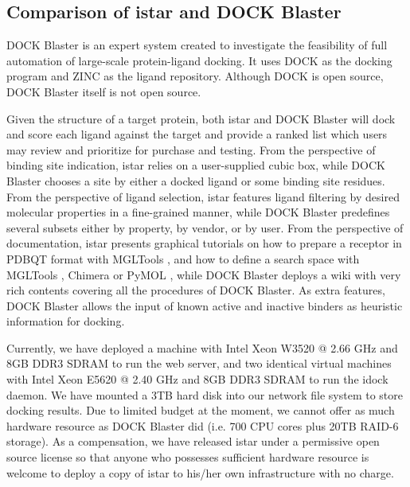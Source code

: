 \documentclass[10pt]{article}
\begin{document}
\subsection*{Comparison of istar and DOCK Blaster}
DOCK Blaster \cite{557} is an expert system created to investigate the feasibility of full automation of large-scale protein-ligand docking. It uses DOCK \cite{1222} as the docking program and ZINC \cite{532,1178} as the ligand repository. Although DOCK is open source, DOCK Blaster itself is not open source.

Given the structure of a target protein, both istar and DOCK Blaster will dock and score each ligand against the target and provide a ranked list which users may review and prioritize for purchase and testing. From the perspective of binding site indication, istar relies on a user-supplied cubic box, while DOCK Blaster chooses a site by either a docked ligand or some binding site residues. From the perspective of ligand selection, istar features ligand filtering by desired molecular properties in a fine-grained manner, while DOCK Blaster predefines several subsets either by property, by vendor, or by user. From the perspective of documentation, istar presents graphical tutorials on how to prepare a receptor in PDBQT format with MGLTools \cite{596}, and how to define a search space with MGLTools \cite{596}, Chimera \cite{1219} or PyMOL \cite{1221}, while DOCK Blaster deploys a wiki with very rich contents covering all the procedures of DOCK Blaster. As extra features, DOCK Blaster allows the input of known active and inactive binders as heuristic information for docking.

Currently, we have deployed a machine with Intel Xeon W3520 @ 2.66 GHz and 8GB DDR3 SDRAM to run the web server, and two identical virtual machines with Intel Xeon E5620 @ 2.40 GHz and 8GB DDR3 SDRAM to run the idock daemon. We have mounted a 3TB hard disk into our network file system to store docking results. Due to limited budget at the moment, we cannot offer as much hardware resource as DOCK Blaster did (i.e. 700 CPU cores plus 20TB RAID-6 storage). As a compensation, we have released istar under a permissive open source license so that anyone who possesses sufficient hardware resource is welcome to deploy a copy of istar to his/her own infrastructure with no charge.

\end{document}
